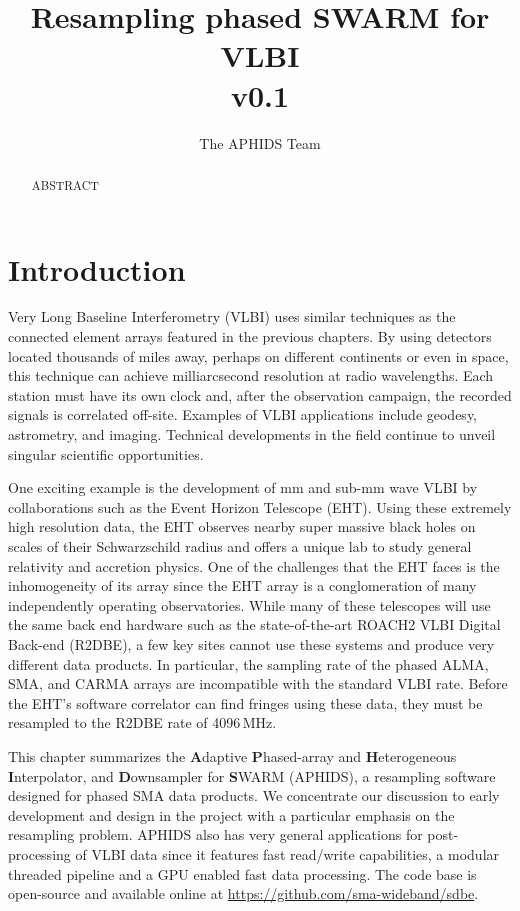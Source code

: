 \documentclass[11pt,preprint]{aastex}
\begin{document}
\title{Resampling phased SWARM for VLBI \\ v0.1}

\author{The APHIDS Team}

\begin{abstract}
ABSTRACT
\end{abstract}

\section{Introduction}

Very Long Baseline Interferometry (VLBI) uses similar techniques as the connected element arrays
featured in the previous chapters.  By using detectors located thousands of miles away, perhaps on different 
continents or even in space, this technique can achieve milliarcsecond resolution at radio wavelengths.  Each 
station must have its own clock and, after the observation campaign, the recorded signals is correlated off-site. 
Examples of VLBI applications include geodesy, astrometry, and imaging. Technical developments in the 
field continue to unveil singular scientific opportunities.

One exciting example is the development of mm and sub-mm wave VLBI by collaborations such as the Event Horizon
Telescope (EHT).  Using these extremely high resolution data, the EHT observes nearby
super massive black holes on scales of their Schwarzschild radius and offers a unique lab to study 
general relativity and accretion physics.  One of the challenges that the EHT faces is the inhomogeneity 
of its array since the EHT array is a conglomeration of many independently operating observatories.
While many of these telescopes will use the same back end hardware such as the state-of-the-art ROACH2 VLBI 
Digital Back-end (R2DBE), a few key sites cannot use these systems and produce very 
different data products. In particular, the sampling rate of the phased ALMA, SMA, and CARMA arrays are 
incompatible with the standard VLBI rate.  Before the EHT's software correlator
\citep[DIFX][]{deller07} can find fringes using these data, they must be resampled to the R2DBE rate of 
4096\,MHz.  

This chapter summarizes the \textbf{A}daptive \textbf{P}hased-array and \textbf{H}eterogeneous 
\textbf{I}nterpolator, and \textbf{D}ownsampler for \textbf{S}WARM (APHIDS), a resampling software designed for 
phased SMA data products.  We concentrate our discussion to early development and design in the project with 
a particular emphasis on the resampling problem.  APHIDS also has very general applications for 
post-processing of VLBI data since it features fast read/write capabilities, a modular threaded pipeline 
and a GPU enabled fast data processing.  The code base is open-source and available online at 
\url{https://github.com/sma-wideband/sdbe}.
\end{document}
